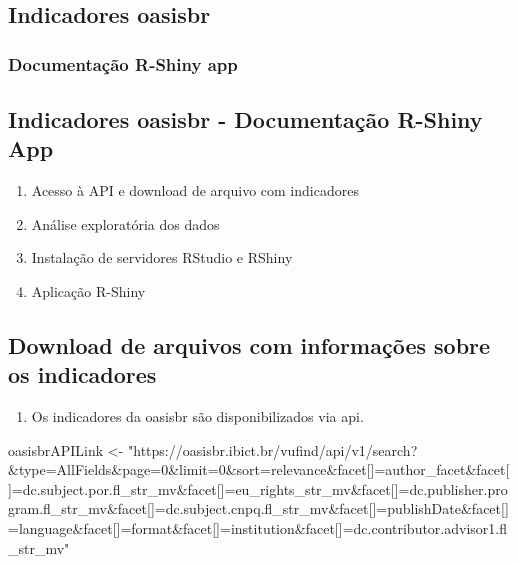 \documentclass[
]{article}
\author{}
\date{\vspace{-2.5em}}
\newenvironment{Shaded}{\begin{snugshade}}{\end{snugshade}}
\newcommand{\NormalTok}[1]{#1}
\newcommand{\OtherTok}[1]{\textcolor[rgb]{0.56,0.35,0.01}{#1}}
\newcommand{\StringTok}[1]{\textcolor[rgb]{0.31,0.60,0.02}{#1}}
\providecommand{\tightlist}{%
  \setlength{\itemsep}{0pt}\setlength{\parskip}{0pt}}
\begin{document}
\hypertarget{section}{%
\section{}\label{section}}

\hypertarget{indicadores-oasisbr}{%
\subsection{Indicadores oasisbr}\label{indicadores-oasisbr}}

\hypertarget{documentauxe7uxe3o-r-shiny-app}{%
\subsubsection{Documentação R-Shiny
app}\label{documentauxe7uxe3o-r-shiny-app}}

\hypertarget{indicadores-oasisbr---documentauxe7uxe3o-r-shiny-app}{%
\subsection{Indicadores oasisbr - Documentação R-Shiny
App}\label{indicadores-oasisbr---documentauxe7uxe3o-r-shiny-app}}

\begin{enumerate}
\def\labelenumi{\arabic{enumi}.}
\tightlist
\item
  Acesso à API e download de arquivo com indicadores
\item
  Análise exploratória dos dados
\item
  Instalação de servidores RStudio e RShiny
\item
  Aplicação R-Shiny
\end{enumerate}

\hypertarget{download-de-arquivos-com-informauxe7uxf5es-sobre-os-indicadores}{%
\subsection{Download de arquivos com informações sobre os
indicadores}\label{download-de-arquivos-com-informauxe7uxf5es-sobre-os-indicadores}}

\begin{enumerate}
\def\labelenumi{\arabic{enumi}.}
\tightlist
\item
  Os indicadores da oasisbr são disponibilizados via api.
\end{enumerate}

\begin{Shaded}
\begin{Highlighting}[]
\NormalTok{oasisbrAPILink }\OtherTok{\textless{}{-}} \StringTok{"https://oasisbr.ibict.br/vufind/api/v1/search?\&type=AllFields\&page=0\&limit=0\&sort=relevance\&facet[]=author\_facet\&facet[]=dc.subject.por.fl\_str\_mv\&facet[]=eu\_rights\_str\_mv\&facet[]=dc.publisher.program.fl\_str\_mv\&facet[]=dc.subject.cnpq.fl\_str\_mv\&facet[]=publishDate\&facet[]=language\&facet[]=format\&facet[]=institution\&facet[]=dc.contributor.advisor1.fl\_str\_mv"}
\end{Highlighting}
\end{Shaded}
\end{document}
